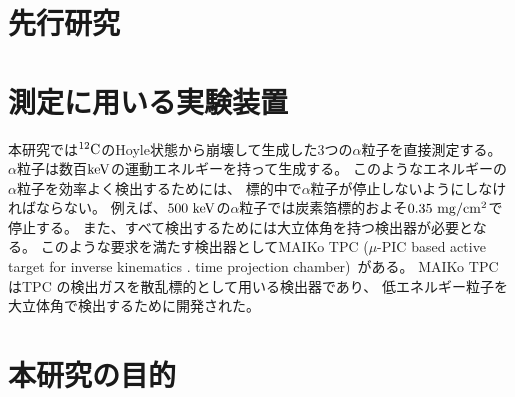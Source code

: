 \section{先行研究}

\section{測定に用いる実験装置}
本研究では${}^{12}\rm{C}$のHoyle状態から崩壊して生成した3つの$\alpha$粒子を直接測定する。
$\alpha$粒子は数百$\rm{keV}$の運動エネルギーを持って生成する。
このようなエネルギーの$\alpha$粒子を効率よく検出するためには、
標的中で$\alpha$粒子が停止しないようにしなければならない。
例えば、$500~\rm{keV}$の$\alpha$粒子では炭素箔標的およそ$0.35~\rm{mg/cm^2}$で停止する。
また、すべて検出するためには大立体角を持つ検出器が必要となる。%
このような要求を満たす検出器としてMAIKo TPC ($\mu$-PIC based active target for inverse kinematics .
time projection chamber)~\cite{maiko, mupic}がある。
MAIKo TPC はTPC の検出ガスを散乱標的として用いる検出器であり、
低エネルギー粒子を大立体角で検出するために開発された。

\section{本研究の目的}
\label{thiswork}

